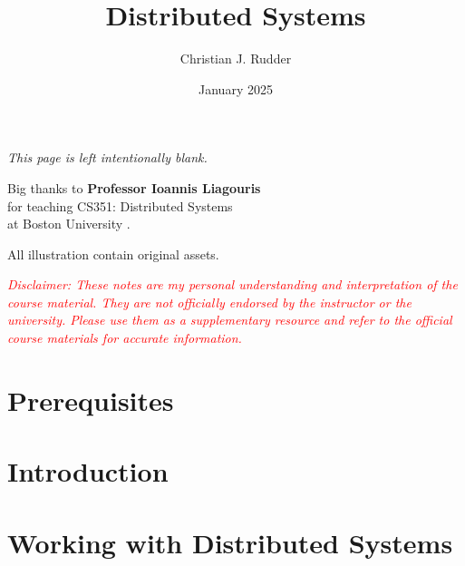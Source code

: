 \documentclass{memoir}
\title{Distributed Systems}
\author{Christian J. Rudder}
\date{January 2025}
\begin{document}
\maketitle
\setcounter{secnumdepth}{2}
\setcounter{tocdepth}{3}

\tableofcontents

\newpage
\thispagestyle{empty}
\mbox{}
\vfill
\begin{center}
    \textit{This page is left intentionally blank.}
\end{center}
\vfill
\newpage
\thispagestyle{empty}
\mbox{}
\vfill
\begin{center}
    \Large{Big thanks to \textbf{Professor Ioannis Liagouris}}\\
    \normalsize 
    for teaching CS351: Distributed Systems\\
    at Boston University \cite{liagouris_cs351}.\\
\end{center}

\vfill

\begin{center}
    \noindent All illustration contain original assets.
\end{center}
    \begin{center}
        \textcolor{red}{\textit{Disclaimer: These notes are my personal understanding and interpretation of the course material. 
        They are not officially endorsed by the instructor or the university. Please use them as a supplementary resource and refer 
        to the official course materials for accurate information.}}
    \end{center}

    \chapter*{Prerequisites}
    
    
\chapter{Introduction}
% 
% 
% 
% 
% 
\chapter{Working with Distributed Systems}


\end{document}
